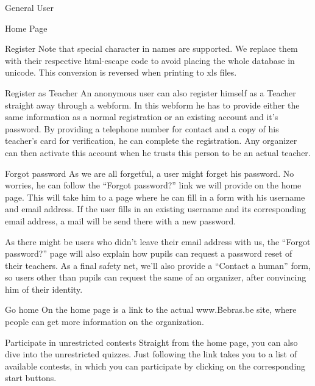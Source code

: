 \begin{section}{General User}
\begin{subsection}{Home Page}
\begin{subsubsection}{Register}
            Note that special character in names are supported. We replace them
            with their respective html-escape code to avoid placing the whole
            database in unicode. This conversion is reversed when printing to
            xls files.
        \end{subsubsection}

        \begin{subsubsection}{Register as Teacher}
            An anonymous user can also register himself as a Teacher straight
            away through a webform. In this webform he has to provide either
            the same information as a normal registration or an existing account
            and it's password. By providing a telephone number for contact and a
            copy of his teacher's card for verification, he can complete the
            registration. Any organizer can then activate this account when he
            trusts this person to be an actual teacher.
        \end{subsubsection}

        \begin{subsubsection}{Forgot password}
            As we are all forgetful, a user might forget his password. No
            worries, he can follow the ``Forgot password?'' link we will provide
            on the home page. This will take him to a page where he can fill in
            a form with his username and email address. If the user fills in an
            existing username and its corresponding email address, a mail will
            be send there with a new password.

            As there might be users who didn't leave their email address with
            us, the ``Forgot password?'' page will also explain how pupils can
            request a password reset of their teachers. As a final safety net,
            we'll also provide a ``Contact a human'' form, so users other than
            pupils can request the same of an organizer, after convincing him of
            their identity.
        \end{subsubsection}

        \begin{subsubsection}{Go home}
            On the home page is a link to the actual www.Bebras.be site, where
            people can get more information on the organization.
        \end{subsubsection}

        \begin{subsubsection}{Participate in unrestricted contests}
            Straight from the home page, you can also dive into the unrestricted
            quizzes. Just following the link takes you to a list of available
            contests, in which you can participate by clicking on the
            corresponding start buttons.


\end{subsubsection}
\end{subsection}
\end{section}

